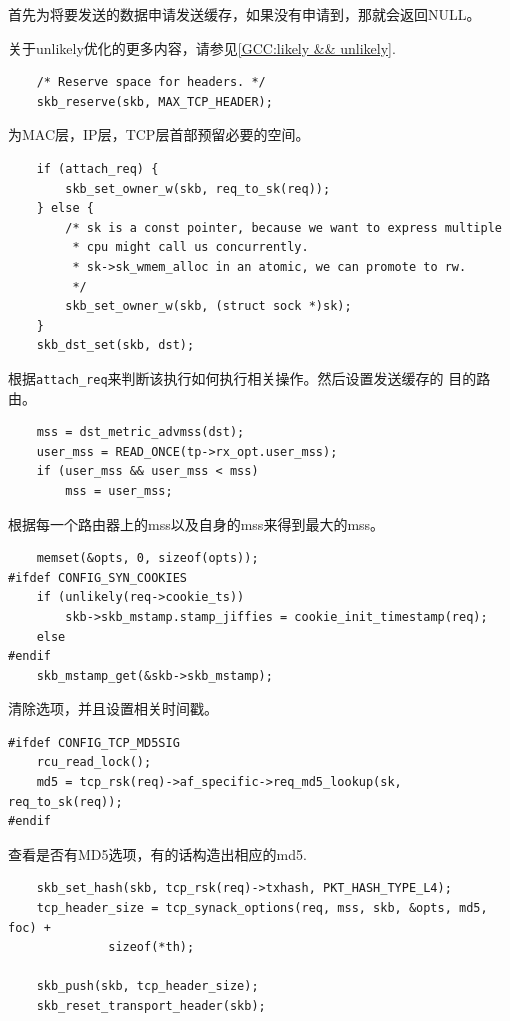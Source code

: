     首先为将要发送的数据申请发送缓存，如果没有申请到，那就会返回NULL。

    关于unlikely优化的更多内容，请参见\ref{GCC:likely && unlikely}.

\begin{verbatim}
    /* Reserve space for headers. */
    skb_reserve(skb, MAX_TCP_HEADER);
\end{verbatim}

    为MAC层，IP层，TCP层首部预留必要的空间。

\begin{verbatim}
    if (attach_req) {
        skb_set_owner_w(skb, req_to_sk(req));
    } else {
        /* sk is a const pointer, because we want to express multiple
         * cpu might call us concurrently.
         * sk->sk_wmem_alloc in an atomic, we can promote to rw.
         */
        skb_set_owner_w(skb, (struct sock *)sk);
    }
    skb_dst_set(skb, dst);
\end{verbatim}

    根据\texttt{attach_req}来判断该执行如何执行相关操作。然后设置发送缓存的
目的路由。%

\begin{verbatim}
    mss = dst_metric_advmss(dst);
    user_mss = READ_ONCE(tp->rx_opt.user_mss);
    if (user_mss && user_mss < mss)
        mss = user_mss;
\end{verbatim}

    根据每一个路由器上的mss以及自身的mss来得到最大的mss。

\begin{verbatim}
    memset(&opts, 0, sizeof(opts));
#ifdef CONFIG_SYN_COOKIES
    if (unlikely(req->cookie_ts))
        skb->skb_mstamp.stamp_jiffies = cookie_init_timestamp(req);
    else
#endif
    skb_mstamp_get(&skb->skb_mstamp);
\end{verbatim}

    清除选项，并且设置相关时间戳。

\begin{verbatim}
#ifdef CONFIG_TCP_MD5SIG
    rcu_read_lock();
    md5 = tcp_rsk(req)->af_specific->req_md5_lookup(sk, req_to_sk(req));
#endif
\end{verbatim}

    查看是否有MD5选项，有的话构造出相应的md5.

\begin{verbatim}
    skb_set_hash(skb, tcp_rsk(req)->txhash, PKT_HASH_TYPE_L4);
    tcp_header_size = tcp_synack_options(req, mss, skb, &opts, md5, foc) +
              sizeof(*th);

    skb_push(skb, tcp_header_size);
    skb_reset_transport_header(skb);
\end{verbatim}

